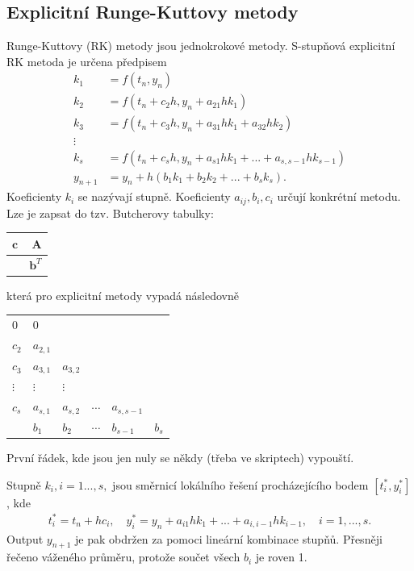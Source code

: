 \documentclass[a4]{report}
\theoremstyle{definition}
\begin{document}
{\subsection{Explicitní Runge-Kuttovy metody}
Runge-Kuttovy (RK) metody jsou jednokrokové metody. S-stupňová explicitní RK metoda je určena předpisem
\begin{align}
k_{1}&= f(t_{n}, y_{n}) \\
k_{2}& = f(t_{n}+c_{2} h, y_{n} + a_{21} h k_{1}) \\
k_{3} &= f(t_{n}+c_{3} h, y_{n} + a_{31} hk_{1} + a_{32}h k_{2}) \\
\vdots& \\
k_{s} & = f(t_{n}+c_{s} h, y_{n} + a_{s1}h k_{1} + ... + a_{s, s-1}h k_{s-1})\\
y_{n+1}&= y_{n} + h(b_{1}k_{1}+b_{2}k_{2} + ...+ b_{s}k_{s}).
\end{align}
Koeficienty $k_{i}$ se nazývají  stupně. Koeficienty $a_{ij}, b_{i}, c_{i}$ určují konkrétní metodu. Lze je zapsat do tzv. Butcherovy tabulky:
\begin{center}  
 \begin{tabular}{r|r}
  $\textbf{c} $ & $\textbf{A} $ \\ \hline
  & $\textbf{b}^{T}$
   \end{tabular}
   \end{center}
   která pro explicitní metody vypadá následovně
   \begin{center}
 \begin{tabular}{l|lllll} 
   $0$      &     $0$        \\
  $ c_{2}$    &  $a_{2,1}$      &         \\
    $c_{3}$    &  $a_{3,1}$      &  $a_{3,2}$       & \\

    $\vdots$      & $\vdots $ & $\vdots$        \\
   $c_{s}$     &  $a_{s,1}$     &  $a_{s,2}$    & $\cdots$ &  $a_{s,s-1}$  &   \\\hline
    &$ b_{1}$        &$ b_{2}$  & $\cdots$   & $b_{s-1}$      & $b_{s} $\\      
  \end{tabular}  
\end{center}
První řádek, kde jsou jen nuly se někdy (třeba ve skriptech) vypouští. 

Stupně $k_{i}, i=1...,s,$ jsou směrnicí lokálního řešení procházejícího bodem $[t_{i}^{*},y_{i}^{*}]$, kde
\begin{align}
t_{i}^{*} = t_{n}+h c_{i}, \quad y_{i}^{*} = y_{n} +  a_{i1}h k_{1} + ... + a_{i, i-1}h k_{i-1}, \quad i=1,...,s.
\end{align}
Output $y_{n+1}$ je pak obdržen za pomoci lineární kombinace stupňů. Přesněji řečeno váženého průměru, protože součet všech $b_{i}$ je roven 1.

}
\end{document}

